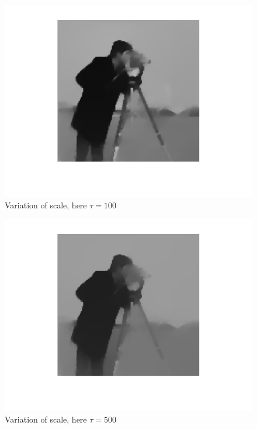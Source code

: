 \documentclass{report}
\begin{document}
\begin{figure}
	\centering
	\includegraphics[]{../out/report_taus07.png}
	\caption{Variation of scale, here $\tau = 100$}
	\label{vis:taus07}
\end{figure}

\begin{figure}
	\centering
	\includegraphics[]{../out/report_taus08.png}
	\caption{Variation of scale, here $\tau = 500$}
	\label{vis:taus08}
\end{figure}
\end{document}
